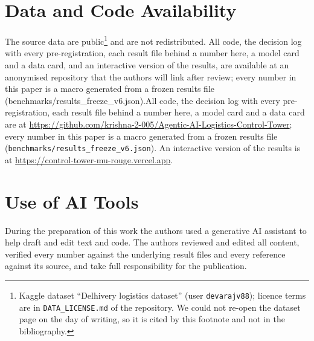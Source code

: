 \section*{Data and Code Availability}
The source data are public\footnote{Kaggle dataset ``Delhivery logistics dataset'' (user \texttt{devarajv88}); licence terms are in \texttt{DATA\_LICENSE.md} of the repository. We could not re-open the dataset page on the day of writing, so it is cited by this footnote and not in the bibliography.} and are not redistributed. \ifdefined\anonmode All code, the decision log with every pre-registration, each result file behind a number here, a model card and a data card, and an interactive version of the results, are available at an anonymised repository that the authors will link after review; every number in this paper is a macro generated from a frozen results file (benchmarks/results\_freeze\_v6.json).\else All code, the decision log with every pre-registration, each result file behind a number here, a model card and a data card are at \url{https://github.com/krishna-2-005/Agentic-AI-Logistics-Control-Tower}; every number in this paper is a macro generated from a frozen results file (\texttt{benchmarks/results\_freeze\_v6.json}). An interactive version of the results is at \url{https://control-tower-mu-rouge.vercel.app}.\fi

\section*{Use of AI Tools}
During the preparation of this work the authors used a generative AI assistant to help draft and edit text and code. The authors reviewed and edited all content, verified every number against the underlying result files and every reference against its source, and take full responsibility for the publication.
